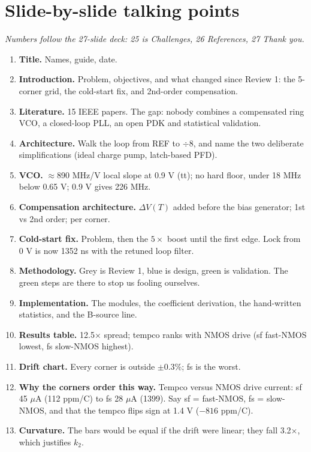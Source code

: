 \documentclass[11pt,a4paper]{article}
\begin{document}
\section{Slide-by-slide talking points}
\noindent\textit{Numbers follow the 27-slide deck: 25 is Challenges, 26 References, 27 Thank you.}
\begin{enumerate}[label=\textbf{\arabic*.}]
\item \textbf{Title.} Names, guide, date.
\item \textbf{Introduction.} Problem, objectives, and what changed since Review 1: the 5-corner grid, the cold-start fix, and 2nd-order compensation.
\item[3--4.] \textbf{Literature.} 15 IEEE papers. The gap: nobody combines a compensated ring VCO, a closed-loop PLL, an open PDK and statistical validation.
\item[5.] \textbf{Architecture.} Walk the loop from REF to $\div8$, and name the two deliberate simplifications (ideal charge pump, latch-based PFD).
\item[6.] \textbf{VCO.} $\approx$890 MHz/V local slope at 0.9 V (tt); no hard floor, under 18 MHz below 0.65 V; 0.9 V gives 226 MHz.
\item[7.] \textbf{Compensation architecture.} $\Delta V(T)$ added before the bias generator; 1st vs 2nd order; per corner.
\item[8.] \textbf{Cold-start fix.} Problem, then the $5\times$ boost until the first edge. Lock from 0 V is now 1352 ns with the retuned loop filter.
\item[9.] \textbf{Methodology.} Grey is Review 1, blue is design, green is validation. The green steps are there to stop us fooling ourselves.
\item[10.] \textbf{Implementation.} The modules, the coefficient derivation, the hand-written statistics, and the B-source line.
\item[11.] \textbf{Results table.} 12.5$\times$ spread; tempco ranks with NMOS drive (sf fast-NMOS lowest, fs slow-NMOS highest).
\item[12.] \textbf{Drift chart.} Every corner is outside $\pm$0.3\%; fs is the worst.
\item[13.] \textbf{Why the corners order this way.} Tempco versus NMOS drive current: sf 45 $\mu$A (112 ppm/\textdegree C) to fs 28 $\mu$A (1399). Say sf = fast-NMOS, fs = slow-NMOS, and that the tempco flips sign at 1.4 V ($-816$ ppm/\textdegree C).
\item[14.] \textbf{Curvature.} The bars would be equal if the drift were linear; they fall 3.2$\times$, which justifies $k_2$.

\end{enumerate}
\end{document}
